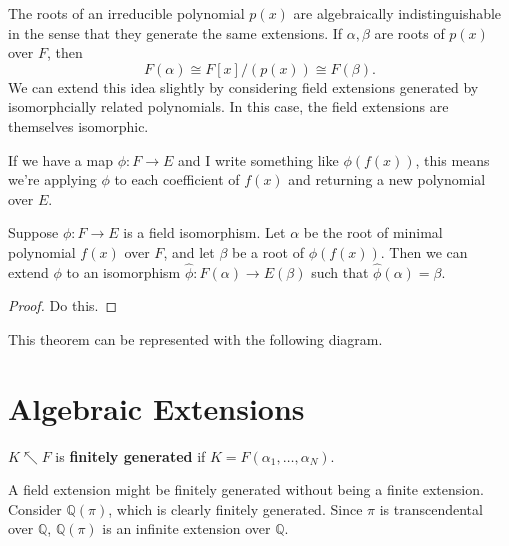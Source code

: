 \documentclass[10pt]{report}
\begin{document}
The roots of an irreducible polynomial $p(x)$ are algebraically indistinguishable in the sense that they generate the same extensions. If $\alpha,\beta$ are roots of $p(x)$ over $F$, then
\[
	F(\alpha) \cong F[x]/(p(x)) \cong F(\beta).
\] 
We can extend this idea slightly by considering field extensions generated by isomorphcially related polynomials. In this case, the field extensions are themselves isomorphic.

\begin{note}[]
	If we have a map $\phi:F\to E$ and I write something like $\phi(f(x))$, this means we're applying $\phi$ to each coefficient of $f(x)$ and returning a new polynomial over $E$.
\end{note}

\begin{thrm}[]
	Suppose $\phi:F\to E$ is a field isomorphism. Let $\alpha$ be the root of minimal polynomial $f(x)$ over $F$, and let $\beta$ be a root of $\phi(f(x))$. Then we can extend $\phi$ to an isomorphism $\hat{\phi} : F(\alpha)\to E(\beta)$ such that $\hat{\phi}(\alpha)=\beta$.
\end{thrm}
\begin{proof}
	{\color{red}Do this.}
\end{proof}

This theorem can be represented with the following diagram.
\begin{center}
\end{center}


\section{Algebraic Extensions}

\begin{defn}[]
	$K \nwarrow F$ is \textbf{finitely generated} if $K = F(\alpha_1, \dots, \alpha_N)$.
\end{defn}

\begin{note}[]
	A field extension might be finitely generated without being a finite extension. Consider $\mathbb{Q}(\pi)$, which is clearly finitely generated. Since $\pi$ is transcendental over $\mathbb{Q}$, $\mathbb{Q}(\pi)$ is an infinite extension over $\mathbb{Q}$.
\end{note}
\end{document}
